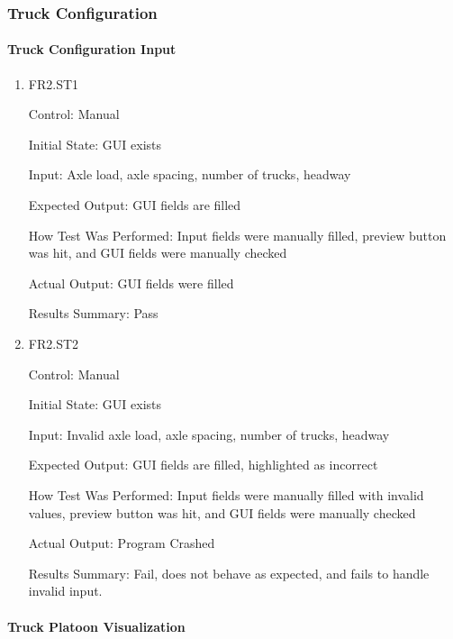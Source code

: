\documentclass[12pt, titlepage]{article}
\begin{document}
\subsubsection{Truck Configuration}

\paragraph{Truck Configuration Input}

\begin{enumerate}

  \item{FR2.ST1\\}

  Control: Manual

  Initial State: GUI exists

  Input: Axle load, axle spacing, number of trucks, headway

  Expected Output: GUI fields are filled

  How Test Was Performed: Input fields were manually filled, preview button was hit, and GUI fields were manually checked

  Actual Output: GUI fields were filled

  Results Summary: Pass

  \item{FR2.ST2\\}

  Control: Manual

  Initial State: GUI exists

  Input: Invalid axle load, axle spacing, number of trucks, headway

  Expected Output: GUI fields are filled, highlighted as incorrect

  How Test Was Performed: Input fields were manually filled with invalid values, preview button was hit, and GUI fields were manually checked

  Actual Output: Program Crashed

  Results Summary: Fail, does not behave as expected, and fails to handle invalid input.

\end{enumerate}

\paragraph{Truck Platoon Visualization}
\end{document}
